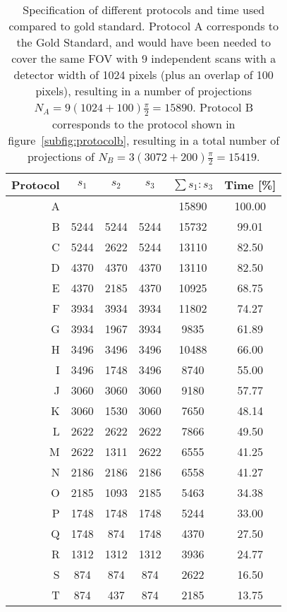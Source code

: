 \cbstart
\begin{table*}[htp]%
	\centering%
	\label{tab:projections2}%
	\caption{Specification of different protocols and time used compared to gold standard. Protocol A corresponds to the Gold Standard, and would have been needed to cover the same FOV with 9 independent scans with a detector width of 1024 pixels (plus an overlap of 100 pixels), resulting in a number of projections $N_{A}=9(1024+100)\frac{\pi}{2}=15890$. Protocol B corresponds to the protocol shown in figure~\ref{subfig:protocolb}, resulting in a total number of projections of $N_{B}=3(3072+200)\frac{\pi}{2}=15419$.}%
	\begin{tabular}{rccccc}%
	\toprule%
		Protocol & $s_{1}$ & $s_{2}$ & $s_{3}$ & $\sum s_{1}:s_{3}$ & Time [\%] \\%
	\midrule%
		A &      &      &      & 15890 & 100.00 \\
		B & 5244 & 5244 & 5244 & 15732 & 99.01 \\
		C & 5244 & 2622 & 5244 & 13110 & 82.50 \\
		D & 4370 & 4370 & 4370 & 13110 & 82.50 \\
		E & 4370 & 2185 & 4370 & 10925 & 68.75 \\
		F & 3934 & 3934 & 3934 & 11802 & 74.27 \\
		G & 3934 & 1967 & 3934 &  9835 & 61.89 \\
		H & 3496 & 3496 & 3496 & 10488 & 66.00 \\
		I & 3496 & 1748 & 3496 &  8740 & 55.00 \\
		J & 3060 & 3060 & 3060 &  9180 & 57.77 \\
		K & 3060 & 1530 & 3060 &  7650 & 48.14 \\
		L & 2622 & 2622 & 2622 &  7866 & 49.50 \\
		M & 2622 & 1311 & 2622 &  6555 & 41.25 \\
		N & 2186 & 2186 & 2186 &  6558 & 41.27 \\
		O & 2185 & 1093 & 2185 &  5463 & 34.38 \\
		P & 1748 & 1748 & 1748 &  5244 & 33.00 \\
		Q & 1748 &  874 & 1748 &  4370 & 27.50 \\
		R & 1312 & 1312 & 1312 &  3936 & 24.77 \\
		S &  874 &  874 &  874 &  2622 & 16.50 \\
		T &  874 &  437 &  874 &  2185 & 13.75 \\
	\bottomrule
	\end{tabular}
\end{table*}
\cbend

